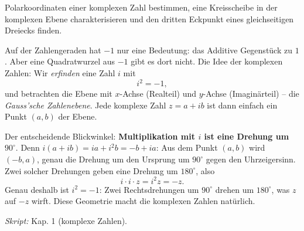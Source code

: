 

Polarkoordinaten einer komplexen Zahl bestimmen, eine Kreisscheibe in der
komplexen Ebene charakterisieren und den dritten Eckpunkt eines
gleichseitigen Dreiecks finden.

\begin{werkzeugkasten}
Auf der Zahlengeraden hat \emph{$-1$} nur eine Bedeutung: das Additive
Gegenstück zu $1$. Aber eine Quadratwurzel aus $-1$ gibt es dort nicht.
Die Idee der komplexen Zahlen: Wir \emph{erfinden} eine Zahl $i$ mit
\[
  i^2=-1,
\]
und betrachten die Ebene mit $x$-Achse (Realteil) und $y$-Achse
(Imaginärteil) -- die \emph{Gauss'sche Zahlenebene}. Jede komplexe Zahl
$z=a+ib$ ist dann einfach ein Punkt $(a,b)$ der Ebene.

Der entscheidende Blickwinkel: \textbf{Multiplikation mit $i$ ist eine
Drehung um $90^\circ$}. Denn $i(a+ib)=ia+i^2b=-b+ia$: Aus dem Punkt
$(a,b)$ wird $(-b,a)$, genau die Drehung um den Ursprung um $90^\circ$
gegen den Uhrzeigersinn. Zwei solcher Drehungen geben eine Drehung um
$180^\circ$, also
\[
  i\cdot i\cdot z=i^2 z=-z .
\]
Genau deshalb ist $i^2=-1$: Zwei Rechtsdrehungen um $90^\circ$ drehen um
$180^\circ$, was $z$ auf $-z$ wirft. Diese Geometrie macht die komplexen
Zahlen natürlich.

\textit{Skript:} Kap. 1 (komplexe Zahlen).
\end{werkzeugkasten}


